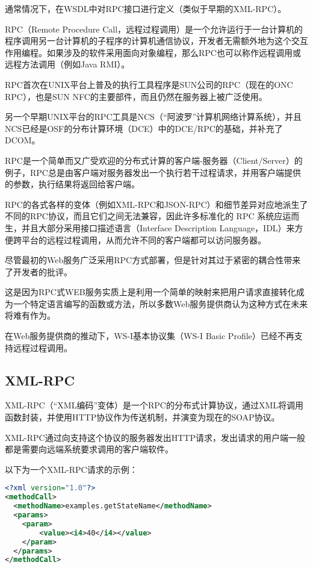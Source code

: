 通常情况下，在WSDL中对RPC接口进行定义（类似于早期的XML-RPC）。


RPC（Remote Procedure Call，远程过程调用）是一个允许运行于一台计算机的程序调用另一台计算机的子程序的计算机通信协议，开发者无需额外地为这个交互作用编程。如果涉及的软件采用面向对象编程，那么RPC也可以称作远程调用或远程方法调用（例如Java RMI）。

RPC首次在UNIX平台上普及的执行工具程序是SUN公司的RPC（现在的ONC RPC），也是SUN NFC的主要部件，而且仍然在服务器上被广泛使用。

另一个早期UNIX平台的RPC工具是NCS（“阿波罗”计算机网络计算系统），并且NCS已经是OSF的分布计算环境（DCE）中的DCE/RPC的基础，并补充了DCOM。

RPC是一个简单而又广受欢迎的分布式计算的客户端-服务器（Client/Server）的例子，RPC总是由客户端对服务器发出一个执行若干过程请求，并用客户端提供的参数，执行结果将返回给客户端。

RPC的各式各样的变体（例如XML-RPC和JSON-RPC）和细节差异对应地派生了不同的RPC协议，而且它们之间无法兼容，因此许多标准化的 RPC 系统应运而生，并且大部分采用接口描述语言（Interface Description Language，IDL）来方便跨平台的远程过程调用，从而允许不同的客户端都可以访问服务器。


尽管最初的Web服务广泛采用RPC方式部署，但是针对其过于紧密的耦合性带来了开发者的批评。

这是因为RPC式WEB服务实质上是利用一个简单的映射来把用户请求直接转化成为一个特定语言编写的函数或方法，所以多数Web服务提供商认为这种方式在未来将难有作为。



在Web服务提供商的推动下，WS-I基本协议集（WS-I Basic Profile）已经不再支持远程过程调用。


\subsection{XML-RPC}

XML-RPC（“XML编码”变体）是一个RPC的分布式计算协议，通过XML将调用函数封装，并使用HTTP协议作为传送机制，并演变为现在的SOAP协议。

XML-RPC通过向支持这个协议的服务器发出HTTP请求，发出请求的用户端一般都是需要向远端系统要求调用的客户端软件。


以下为一个XML-RPC请求的示例：

\begin{lstlisting}[language=XML]
<?xml version="1.0"?>
<methodCall>
  <methodName>examples.getStateName</methodName>
  <params>
    <param>
        <value><i4>40</i4></value>
    </param>
  </params>
</methodCall>
\end{lstlisting}

